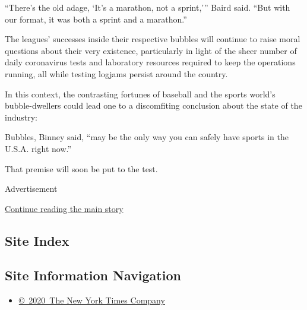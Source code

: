 ``There's the old adage, `It's a marathon, not a sprint,''' Baird said.
``But with our format, it was both a sprint and a marathon.''

The leagues' successes inside their respective bubbles will continue to
raise moral questions about their very existence, particularly in light
of the sheer number of daily coronavirus tests and laboratory resources
required to keep the operations running, all while testing logjams
persist around the country.

In this context, the contrasting fortunes of baseball and the sports
world's bubble-dwellers could lead one to a discomfiting conclusion
about the state of the industry:

Bubbles, Binney said, ``may be the only way you can safely have sports
in the U.S.A. right now.''

That premise will soon be put to the test.

Advertisement

\protect\hyperlink{after-bottom}{Continue reading the main story}

\hypertarget{site-index}{%
\subsection{Site Index}\label{site-index}}

\hypertarget{site-information-navigation}{%
\subsection{Site Information
Navigation}\label{site-information-navigation}}

\begin{itemize}
\tightlist
\item
  \href{https://help.nytimes3xbfgragh.onion/hc/en-us/articles/115014792127-Copyright-notice}{©~2020~The
  New York Times Company}
\end{itemize}

